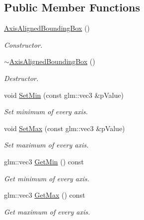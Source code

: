 \subsection*{Public Member Functions}
\begin{DoxyCompactItemize}
\item 
\hyperlink{class_axis_aligned_bounding_box_a37ad09214f16a57cb65e8211520fdab1}{Axis\+Aligned\+Bounding\+Box} ()
\begin{DoxyCompactList}\small\item\em Constructor. \end{DoxyCompactList}\item 
\hyperlink{class_axis_aligned_bounding_box_a04f65467805e6fbf05eeb89326443d87}{$\sim$\+Axis\+Aligned\+Bounding\+Box} ()
\begin{DoxyCompactList}\small\item\em Destructor. \end{DoxyCompactList}\item 
void \hyperlink{class_axis_aligned_bounding_box_a7894714a4217a29ae7447ff03faa2dc5}{Set\+Min} (const glm\+::vec3 \&p\+Value)
\begin{DoxyCompactList}\small\item\em Set minimum of every axis. \end{DoxyCompactList}\item 
void \hyperlink{class_axis_aligned_bounding_box_a2c88b1476bb87ecbeb1da4ea675c1ab8}{Set\+Max} (const glm\+::vec3 \&p\+Value)
\begin{DoxyCompactList}\small\item\em Set maximum of every axis. \end{DoxyCompactList}\item 
glm\+::vec3 \hyperlink{class_axis_aligned_bounding_box_aa3867c1555ed5b1c1735aafff5c6152f}{Get\+Min} () const 
\begin{DoxyCompactList}\small\item\em Get minimum of every axis. \end{DoxyCompactList}\item 
glm\+::vec3 \hyperlink{class_axis_aligned_bounding_box_af62e68083f2ca3497140849bc6bb34f3}{Get\+Max} () const 
\begin{DoxyCompactList}\small\item\em Get maximum of every axis. \end{DoxyCompactList}\end{DoxyCompactItemize}
